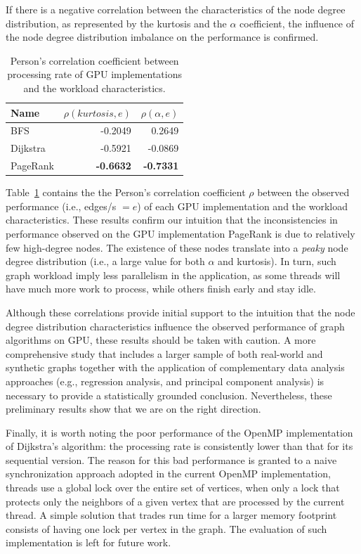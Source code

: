 If there is a negative correlation between the characteristics of the node degree distribution, as represented by the kurtosis and the $\alpha$ coefficient, the influence of the node degree distribution imbalance on the performance is confirmed. 

\begin{table}[ht]
\centering
\begin{tabular}{l|r|r}
Name     & $\rho(kurtosis,e)$ & $\rho(\alpha,e)$ \\\hline
BFS      & -0.2049       &  0.2649 \\\hline
Dijkstra & -0.5921       & -0.0869 \\\hline
PageRank & {\bf -0.6632} & {\bf -0.7331} \\\hline
\end{tabular}
\caption{Person's correlation coefficient between processing rate of GPU implementations and the workload characteristics.}
\label{tab:corr}
\end{table}

Table~\ref{tab:corr} contains the the Person's correlation coefficient $\rho$ between the observed performance (i.e., edges/s $= e$) of each GPU implementation and the workload characteristics. These results confirm our intuition that the inconsistencies in performance observed on the GPU implementation PageRank is due to relatively few high-degree nodes. The existence of these nodes translate into a {\em peaky} node degree distribution (i.e., a large value for both $\alpha$ and kurtosis). In turn, such graph workload imply less parallelism in the application, as some threads will have much more work to process, while others finish early and stay idle. 

Although these correlations provide initial support to the intuition that the node degree distribution characteristics influence the observed performance of graph algorithms on GPU, these results should be taken with caution. A more comprehensive study that includes a larger sample of both real-world and synthetic graphs together with the application of complementary data analysis approaches (e.g., regression analysis, and principal component analysis) is necessary to provide a statistically grounded conclusion. Nevertheless, these preliminary results show that we are on the right direction.

Finally, it is worth noting the poor performance of the OpenMP implementation of Dijkstra's algorithm: the processing rate is consistently lower than that for its sequential version. The reason for this bad performance is granted to a naive synchronization approach adopted in the current OpenMP implementation, threads use a global lock over the entire set of vertices, when only a lock that protects only the neighbors of a given vertex that are processed by the current thread. A simple solution that trades run time for a larger memory footprint consists of having one lock per vertex in the graph. The evaluation of such implementation is left for future work.
